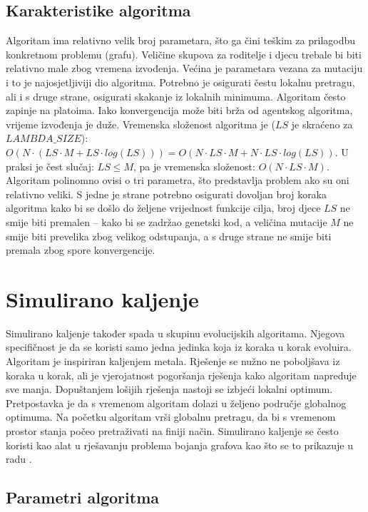 \documentclass[times, utf8, diplomski, numeric]{fer}
\begin{document}
\subsection{Karakteristike algoritma}

Algoritam ima relativno velik broj parametara, što ga čini teškim za prilagodbu konkretnom problemu (grafu). Veličine skupova za roditelje i djecu trebale bi biti relativno male zbog vremena izvođenja. Većina je parametara vezana za mutaciju i to je najosjetljiviji dio algoritma. Potrebno je osigurati čestu lokalnu pretragu, ali i s druge strane, osigurati skakanje iz lokalnih minimuma. Algoritam često zapinje na platoima. Iako konvergencija može biti brža od agentskog algoritma, vrijeme izvođenja je duže.
Vremenska složenost algoritma je ($LS$ je skraćeno za $LAMBDA\_SIZE$): $O(N\cdot(LS \cdot M + LS\cdot log(LS)))=O(N\cdot LS\cdot M + N\cdot LS \cdot log(LS))$. U praksi je čest slučaj: $LS\le M$, pa je vremenska složenost: $O(N\cdot LS \cdot M)$. Algoritam polinomno ovisi o tri parametra, što predstavlja problem ako su oni relativno veliki. S jedne je strane potrebno osigurati dovoljan broj koraka algoritma kako bi se došlo do željene vrijednost funkcije cilja, broj djece $LS$ ne smije biti premalen -- kako bi se zadržao genetski kod, a veličina mutacije $M$ ne smije biti prevelika zbog velikog odstupanja, a s druge strane ne smije biti premala zbog spore konvergencije. 

\section{Simulirano kaljenje}

Simulirano kaljenje također spada u skupinu evolucijskih algoritama. Njegova specifičnost je da se koristi samo jedna jedinka koja iz koraka u korak evoluira. Algoritam je inspiriran kaljenjem metala. Rješenje se nužno ne poboljšava iz koraka u korak, ali je vjerojatnost pogoršanja rješenja kako algoritam napreduje sve manja. Dopuštanjem lošijih rješenja nastoji se izbjeći lokalni optimum. Pretpostavka je da s vremenom algoritam dolazi u željeno područje globalnog optimuma. Na početku algoritam vrši globalnu pretragu, da bi s vremenom prostor stanja počeo pretraživati na finiji način. Simulirano kaljenje se često koristi kao alat u rješavanju problema bojanja grafova kao što se to prikazuje u radu \cite{lit13}.

\subsection{Parametri algoritma}
\end{document}
